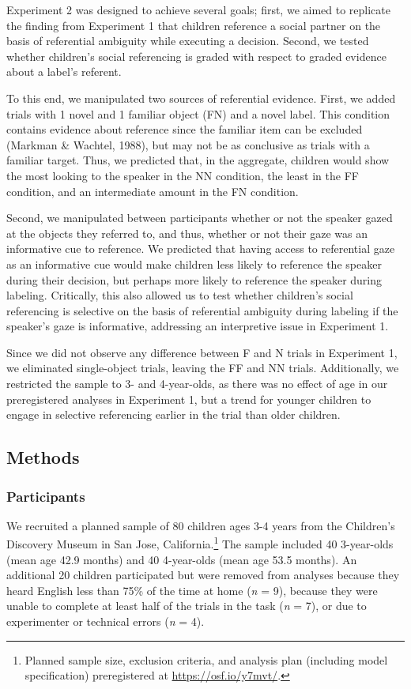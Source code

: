 \documentclass[a4paper,man,apacite,floatsintext]{apa6}
\begin{document}
Experiment 2 was designed to achieve several goals; first, we aimed to
replicate the finding from Experiment 1 that children reference a social
partner on the basis of referential ambiguity while executing a
decision. Second, we tested whether children's social referencing is
graded with respect to graded evidence about a label's referent.

To this end, we manipulated two sources of referential evidence. First,
we added trials with 1 novel and 1 familiar object (FN) and a novel
label. This condition contains evidence about reference since the
familiar item can be excluded (Markman \& Wachtel, 1988), but may not be
as conclusive as trials with a familiar target. Thus, we predicted that,
in the aggregate, children would show the most looking to the speaker in
the NN condition, the least in the FF condition, and an intermediate
amount in the FN condition.

Second, we manipulated between participants whether or not the speaker
gazed at the objects they referred to, and thus, whether or not their
gaze was an informative cue to reference. We predicted that having
access to referential gaze as an informative cue would make children
less likely to reference the speaker during their decision, but perhaps
more likely to reference the speaker during labeling. Critically, this
also allowed us to test whether children's social referencing is
selective on the basis of referential ambiguity during labeling if the
speaker's gaze is informative, addressing an interpretive issue in
Experiment 1.

Since we did not observe any difference between F and N trials in
Experiment 1, we eliminated single-object trials, leaving the FF and NN
trials. Additionally, we restricted the sample to 3- and 4-year-olds, as
there was no effect of age in our preregistered analyses in Experiment
1, but a trend for younger children to engage in selective referencing
earlier in the trial than older children.

\subsection{Methods}\label{methods-1}

\subsubsection{Participants}\label{participants-1}

We recruited a planned sample of 80 children ages 3-4 years from the
Children's Discovery Museum in San Jose, California.\footnote{Planned
  sample size, exclusion criteria, and analysis plan (including model
  specification) preregistered at \url{https://osf.io/y7mvt/}.} The
sample included 40 3-year-olds (mean age 42.9 months) and 40 4-year-olds
(mean age 53.5 months). An additional 20 children participated but were
removed from analyses because they heard English less than 75\% of the
time at home (\emph{n} = 9), because they were unable to complete at
least half of the trials in the task (\emph{n} = 7), or due to
experimenter or technical errors (\emph{n} = 4).
\end{document}
